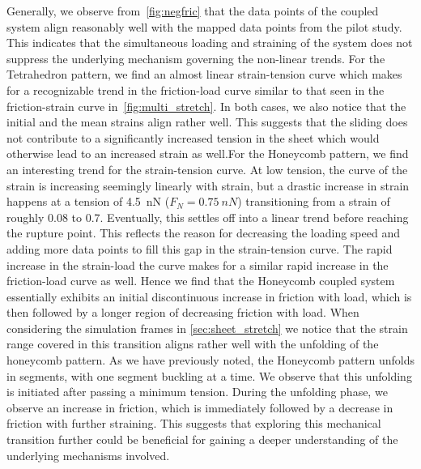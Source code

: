 Generally, we observe from~\cref{fig:negfric} that the data points of the
coupled system align reasonably well with the mapped data points from the pilot
study. This indicates that the simultaneous loading and straining of the system
does not suppress the underlying mechanism governing the non-linear trends. For
the Tetrahedron pattern, we find an almost linear strain-tension curve which
makes for a recognizable trend in the friction-load curve similar to that seen
in the friction-strain curve in~\cref{fig:multi_stretch}. In both cases, we
also notice that the initial and the mean strains align rather well. This
suggests that the sliding does not contribute to a significantly increased
tension in the sheet which would otherwise lead to an increased strain as well.For the Honeycomb pattern, we find an interesting trend for the strain-tension
curve. At low tension, the curve of the strain is increasing seemingly linearly
with strain, but a drastic increase in strain happens at a tension of \SI{4.5}{nN} ($F_N = \SI{0.75}{nN}$) transitioning from a strain of roughly 0.08 to 0.7. Eventually, this settles off into a linear trend before reaching the rupture point. This
reflects the reason for decreasing the loading speed and adding more data points
to fill this gap in the strain-tension curve. The rapid increase in the strain-load
the curve makes for a similar rapid increase in the friction-load curve as well.
Hence we find that the Honeycomb coupled system essentially exhibits an initial discontinuous increase in friction with load, which is then followed by a longer region of decreasing friction with load. When considering the simulation frames in
\cref{sec:sheet_stretch} we notice that the strain range covered in this transition aligns rather well with the unfolding of the honeycomb pattern. As we have previously noted, the Honeycomb pattern unfolds in segments, with one segment buckling at a time. We observe that this unfolding is initiated after passing a minimum tension. During the unfolding phase, we observe an increase in friction, which is immediately followed by a decrease in friction with further straining. This suggests that exploring this mechanical transition further could be beneficial for gaining a deeper understanding of the underlying mechanisms involved. 

